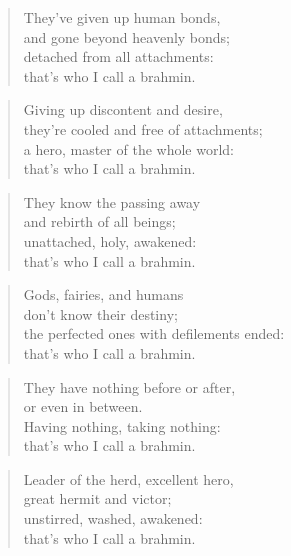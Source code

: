 \documentclass[12pt,openany]{book}%
\begin{document}
\begin{verse}%
They’ve given up human bonds, \\
and gone beyond heavenly bonds; \\
detached from all attachments: \\
that’s who I call a brahmin. 

%
\end{verse}

\begin{verse}%
Giving up discontent and desire, \\
they’re cooled and free of attachments; \\
a hero, master of the whole world: \\
that’s who I call a brahmin. 

%
\end{verse}

\begin{verse}%
They know the passing away \\
and rebirth of all beings; \\
unattached, holy, awakened: \\
that’s who I call a brahmin. 

%
\end{verse}

\begin{verse}%
Gods, fairies, and humans \\
don’t know their destiny; \\
the perfected ones with defilements ended: \\
that’s who I call a brahmin. 

%
\end{verse}

\begin{verse}%
They have nothing before or after, \\
or even in between. \\
Having nothing, taking nothing: \\
that’s who I call a brahmin. 

%
\end{verse}

\begin{verse}%
Leader of the herd, excellent hero, \\
great hermit and victor; \\
unstirred, washed, awakened: \\
that’s who I call a brahmin. 

%
\end{verse}
\end{document}
